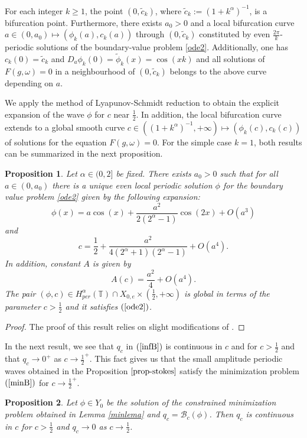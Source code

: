 \documentclass[12pt,reqno]{amsart}
\newcommand{\2}{L^2_{per}(0, T)}
\newtheorem{prop}{Proposition}[section]
\numberwithin{equation}{section}
\numberwithin{figure}{section}
\begin{document}
 For each integer $k\geq 1$, the point $(0, \tilde{c}_k)$, where $\tilde{c}_k := (1+ k^{\alpha})^{-1}$, is a bifurcation point. Furthermore, there exists $a_0>0$ and a local bifurcation curve $a \in (0,a_0)\mapsto (\phi_k(a), c_k(a)) $ through $(0,\tilde{c}_k)$ constituted by even $\frac{2\pi}{k}$-periodic solutions of the boundary-value problem \eqref{ode2}. Additionally, one has $c_k(0)=\tilde{c}_k$ and $D_a \phi_k(0)= \tilde{\phi}_k(x)= \cos(xk)$ and all solutions of $F(g, \omega)=0$ in a neighbourhood of $(0, \tilde{c}_k)$ belongs to the above curve depending on $a$.

We apply the method of Lyapunov-Schmidt reduction to obtain the explicit  expansion of the wave $\phi$ for $c$ near $\frac{1}{2}$. In addition, the local bifurcation curve extends to a global smooth curve $c \in ((1+k^{\alpha})^{-1}, +\infty) \mapsto (\phi_k(c), c_k(c))$ of solutions for the equation $F(g, \omega)=0$. For the simple case $k=1$, both results can be summarized in the next proposition.

	\begin{prop}\label{prop-stokes}
	Let  $\alpha \in (0,2]$ be fixed. There exists $a_0>0$ such that for all $a \in (0, a_0)$ there is a unique even local periodic solution $\phi$ for the boundary value problem \eqref{ode2} given by the following expansion:
\begin{equation}\label{exp-sol}
	\phi(x)= a\cos(x) + \frac{a^2}{2(2^{\alpha} -1)} \cos(2x) + O(a^3)
\end{equation}
and
\begin{equation}\label{exp-speed}
	c= \frac{1}{2} + \frac{a^2}{4(2^\alpha +1)(2^\alpha -1)} + O(a^4).
\end{equation}
In addition, constant $A$ is given by
\begin{equation}\label{exp-ci}
	A(c) = \frac{a^2}{4} + O(a^4).
\end{equation} The pair $(\phi, c) \in H^{\alpha}_{per}(\mathbb{T})\cap X_{0,e} \times (\frac{1}{2}, + \infty)$ is global in terms of the parameter $c>\frac{1}{2}$ and it satisfies $(\ref{ode2})$.
	\end{prop}
\begin{proof}

The proof of this result relies on slight modifications of \cite[Theorem 5.4 and Theorem 5.6]{BD}.
\end{proof}


\indent In the next result, we see that $q_c$ in $(\ref{infB})$ is continuous in $c$ and for $c>\frac{1}{2}$ and that $q_c\rightarrow 0^+$ as $c\rightarrow \frac{1}{2}^+$. This fact gives us that the small amplitude periodic waves obtained in the Proposition $\ref{prop-stokes}$ satisfy the minimization problem $(\ref{minB})$ for $c\rightarrow \frac{1}{2}^{+}$.
\begin{prop}
	\label{coro-continuity}
	Let $\phi \in Y_0$ be the solution of the constrained minimization problem obtained in Lemma \ref{minlema} and $q_c = \mathcal{B}_c(\phi)$. Then $q_c$ is continuous in
	$c$ for $c > \frac{1}{2}$ and $q_c \to 0$ as $c \to \frac{1}{2}$.
\end{prop}
\end{document}
